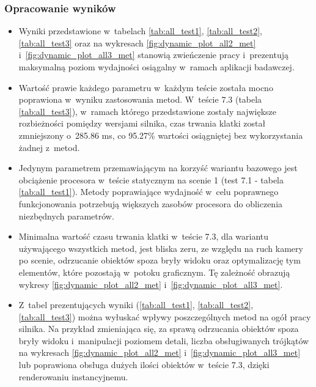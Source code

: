 \documentclass[a4paper,twoside,12pt]{book}
\begin{document}
\vbox{}


\subsubsection{Opracowanie wyników}
\begin{itemize}
    \item Wyniki przedstawione w~tabelach \ref{tab:all_test1}, \ref{tab:all_test2}, \ref{tab:all_test3} oraz na wykresach \ref{fig:dynamic_plot_all2_met} i~\ref{fig:dynamic_plot_all3_met} stanowią zwieńczenie pracy i~prezentują maksymalną poziom wydajności osiągalny w~ramach aplikacji badawczej.
    \item Wartość prawie każdego parametru w~każdym teście została mocno poprawiona w~wyniku zastosowania metod. W~teście 7.3 (tabela \ref{tab:all_test3}), w~ramach którego przedstawione zostały największe rozbieżności pomiędzy wersjami silnika, czas trwania klatki został zmniejszony o~285.86 ms, co 95.27\% wartości osiągniętej bez wykorzystania żadnej z~metod.
    \item Jedynym parametrem przemawiającym na korzyść wariantu bazowego jest obciążenie procesora w~teście statycznym na scenie 1 (test 7.1 - tabela \ref{tab:all_test1}). Metody poprawiające wydajność w~celu poprawnego funkcjonowania potrzebują większych zasobów procesora do obliczenia niezbędnych parametrów.
    \item Minimalna wartość czasu trwania klatki w~teście 7.3, dla wariantu używającego wszystkich metod, jest bliska zeru, ze względu na ruch kamery po scenie, odrzucanie obiektów spoza bryły widoku oraz optymalizację tym elementów, które pozostają w~potoku graficznym. Tę zależność obrazują wykresy \ref{fig:dynamic_plot_all2_met} i~\ref{fig:dynamic_plot_all3_met}.
    \item Z~tabel prezentujących wyniki (\ref{tab:all_test1}, \ref{tab:all_test2}, \ref{tab:all_test3}) można wyłuskać wpływy poszczególnych metod na ogół pracy silnika. Na przykład zmieniająca się, za sprawą odrzucania obiektów spoza bryły widoku i~manipulacji poziomem detali, liczba obsługiwanych trójkątów na wykresach \ref{fig:dynamic_plot_all2_met} i~\ref{fig:dynamic_plot_all3_met} lub poprawiona obsługa dużych ilości obiektów w~teście 7.3, dzięki renderowaniu instancyjnemu.
\end{itemize}
\end{document}
